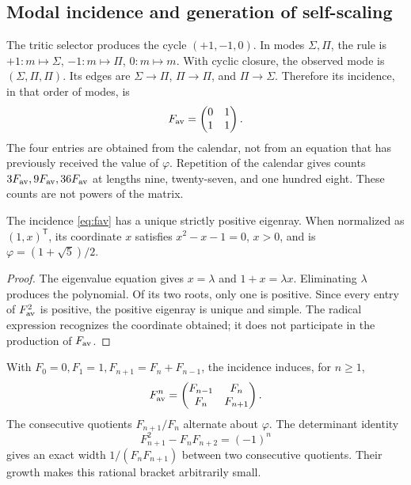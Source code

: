 \subsection{Modal incidence and generation of self-scaling}

The tritic selector produces the cycle \((+1,-1,0)\). In modes \(\Sigma,\Pi\), the rule is \(+1:m\mapsto\Sigma\), \(-1:m\mapsto\Pi\), \(0:m\mapsto m\). With cyclic closure, the observed mode is \((\Sigma,\Pi,\Pi)\). Its edges are \(\Sigma\to\Pi\), \(\Pi\to\Pi\), and \(\Pi\to\Sigma\). Therefore its incidence, in that order of modes, is
\begin{equation}
 F_{\rm av}=\begin{pmatrix}0&1\\1&1\end{pmatrix}.
 \label{eq:fav}
\end{equation}
The four entries are obtained from the calendar, not from an equation that has previously received the value of \(\varphi\). Repetition of the calendar gives counts \(3F_{\rm av},9F_{\rm av},36F_{\rm av}\) at lengths nine, twenty-seven, and one hundred eight. These counts are not powers of the matrix.

\begin{theorem}
The incidence \eqref{eq:fav} has a unique strictly positive eigenray. When normalized as \((1,x)^{\mathsf T}\), its coordinate \(x\) satisfies \(x^2-x-1=0\), \(x>0\), and is \(\varphi=(1+\sqrt5)/2\).
\end{theorem}
\begin{proof}
The eigenvalue equation gives \(x=\lambda\) and \(1+x=\lambda x\). Eliminating \(\lambda\) produces the polynomial. Of its two roots, only one is positive. Since every entry of \(F_{\rm av}^2\) is positive, the positive eigenray is unique and simple. The radical expression recognizes the coordinate obtained; it does not participate in the production of \(F_{\rm av}\).
\end{proof}

With \(F_0=0,F_1=1,F_{n+1}=F_n+F_{n-1}\), the incidence induces, for \(n\geq1\),
\[
 F_{\rm av}^n=\begin{pmatrix}F_{n-1}&F_n\\F_n&F_{n+1}\end{pmatrix}.
\]
The consecutive quotients \(F_{n+1}/F_n\) alternate about \(\varphi\). The determinant identity
\[
 F_{n+1}^2-F_nF_{n+2}=(-1)^n
\]
gives an exact width \(1/(F_nF_{n+1})\) between two consecutive quotients. Their growth makes this rational bracket arbitrarily small.

